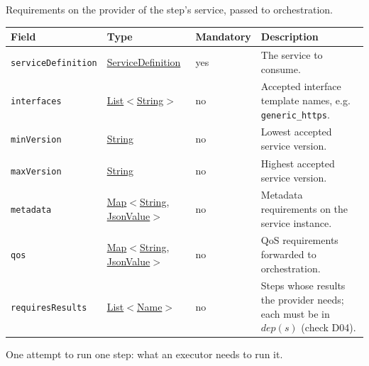 \documentclass[a4paper]{arrowhead}
\newcommand{\pref}[1]{{\textcolor{ArrowheadGrey}{\hyperref[sec:model:primitives:#1]{#1}}}}
\begin{document}
Requirements on the provider of the step's service, passed to orchestration.

{\small
\begin{longtable}{|p{3.7cm}|p{4.2cm}|p{1.6cm}|p{6.3cm}|}

\hline
\rowcolor{gray!33} Field & Type & Mandatory & Description \\ \hline
\endhead
\texttt{serviceDefinition} & \pref{ServiceDefinition} & yes & The service to consume. \\ \hline
\texttt{interfaces} & \pref{List}$<$\pref{String}$>$ & no & Accepted interface template names, e.g. \texttt{generic\_https}. \\ \hline
\texttt{minVersion} & \pref{String} & no & Lowest accepted service version. \\ \hline
\texttt{maxVersion} & \pref{String} & no & Highest accepted service version. \\ \hline
\texttt{metadata} & \pref{Map}$<$\pref{String}, \pref{JsonValue}$>$ & no & Metadata requirements on the service instance. \\ \hline
\texttt{qos} & \pref{Map}$<$\pref{String}, \pref{JsonValue}$>$ & no & QoS requirements forwarded to orchestration. \\ \hline
\texttt{requiresResults} & \pref{List}$<$\pref{Name}$>$ & no & Steps whose results the provider needs; each must be in $dep(s)$ (check D04). \\ \hline
\end{longtable}
}

One attempt to run one step: what an executor needs to run it.
\end{document}
